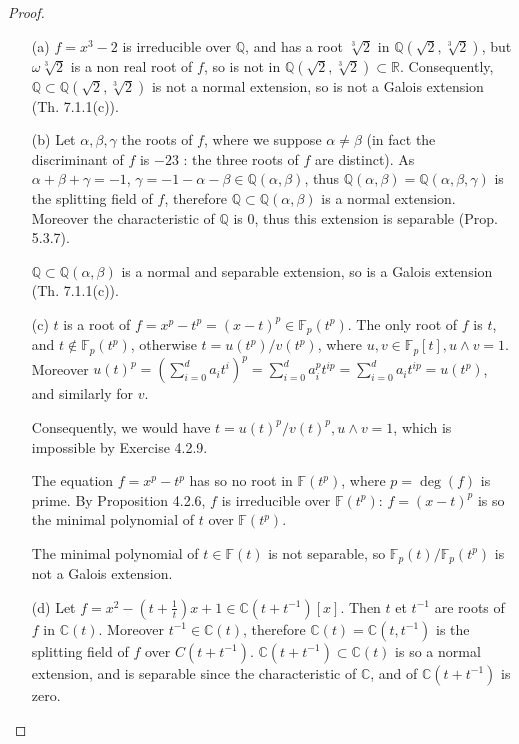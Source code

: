 \documentclass[11pt,a4paper]{article}
\newcommand{\Q}{\mathbb{Q}}
\newcommand{\R}{\mathbb{R}}
\newcommand{\C}{\mathbb{C}}
\newcommand{\F}{\mathbb{F}}
\begin{document}
\begin{proof}
\begin{enumerate}
\item[(a)]
$f = x^3-2$ is  irreducible over $\Q$, and has a root $\sqrt[3]{2}$ in $\Q(\sqrt{2},\sqrt[3]{2})$, but $\omega \sqrt[3]{2}$ is a non real root of $f$, so is not in $\Q(\sqrt{2},\sqrt[3]{2}) \subset \R$. Consequently, $\Q \subset \Q(\sqrt{2},\sqrt[3]{2})$ is not a normal extension, so is not a Galois extension (Th. 7.1.1(c)).

\item[(b)]
Let  $\alpha,\beta,\gamma$ the roots of $f$, where we suppose $\alpha \neq \beta $ (in fact the discriminant of $f$ is $-23$ : the three roots of $f$ are distinct). As $\alpha+\beta+\gamma = -1$, $\gamma = -1 - \alpha - \beta \in \Q(\alpha,\beta)$, thus $\Q(\alpha,\beta) = \Q(\alpha,\beta,\gamma)$ is the splitting field of $f$, therefore  $\Q \subset \Q(\alpha,\beta)$ is a normal extension. Moreover the characteristic of $\Q$ is 0, thus this extension is separable (Prop. 5.3.7).

$\Q \subset \Q(\alpha,\beta)$ is a normal and separable extension, so is a Galois extension (Th. 7.1.1(c)).

\item[(c)]$t$ is a root of $f = x^p-t^p = (x-t)^p\in \F_p(t^p)$.
The only root of $f$ is $t$, and $t \not \in \F_p(t^p)$, otherwise $t = u(t^p)/v(t^p)$, where $u,v \in \F_p[t], u \wedge v= 1$. Moreover $u(t)^p = (\sum_{i=0}^d a_i t^i)^p = \sum_{i=0}^d a_i^p t^{ip} = \sum_{i=0}^da_i t^{ip} = u(t^p)$, and similarly for $v$.

Consequently, we would have $t= u(t)^p/v(t)^p,u\wedge v = 1$, which is impossible by Exercise 4.2.9.

The equation $f = x^p - t^p$ has so no root in $\F(t^p)$, where $p =\deg(f)$ is prime. By Proposition 4.2.6, $f$ is irreducible over $\F(t^p)$: $f = (x-t)^p$ is so the minimal polynomial of $t$ over $\F(t^p)$.

The minimal polynomial of $t \in \F(t)$ is not separable, so $\F_p(t)/\F_p(t^p)$ is not a Galois extension.

\item[(d)]
Let $f = x^2-\left(t+\frac{1}{t}\right)x + 1 \in \C(t+t^{-1})[x]$. Then  $t$ et $t^{-1}$ are roots of $f$ in  $\C(t)$. Moreover $t^{-1} \in \C(t)$, therefore $\C(t) = \C(t,t^{-1})$ is the splitting field of $f$ over $C(t+t^{-1})$. $ \C(t+t^{-1}) \subset \C(t)$ is so a normal extension, and is separable since the characteristic of $\C$, and of $\C(t+t^{-1})$ is zero. 


\end{enumerate}
\end{proof}
\end{document}

